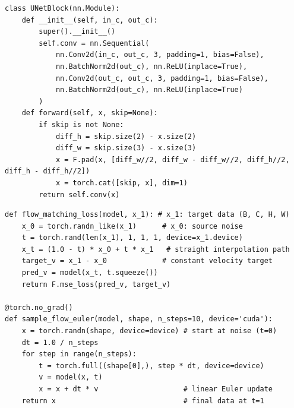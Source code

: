 \begin{lstlisting}
class UNetBlock(nn.Module):
    def __init__(self, in_c, out_c):
        super().__init__()
        self.conv = nn.Sequential(
            nn.Conv2d(in_c, out_c, 3, padding=1, bias=False),
            nn.BatchNorm2d(out_c), nn.ReLU(inplace=True),
            nn.Conv2d(out_c, out_c, 3, padding=1, bias=False),
            nn.BatchNorm2d(out_c), nn.ReLU(inplace=True)
        )
    def forward(self, x, skip=None):
        if skip is not None:
            diff_h = skip.size(2) - x.size(2)
            diff_w = skip.size(3) - x.size(3)
            x = F.pad(x, [diff_w//2, diff_w - diff_w//2, diff_h//2, diff_h - diff_h//2])
            x = torch.cat([skip, x], dim=1)
        return self.conv(x)
\end{lstlisting}

\begin{lstlisting}
def flow_matching_loss(model, x_1): # x_1: target data (B, C, H, W)
    x_0 = torch.randn_like(x_1)      # x_0: source noise
    t = torch.rand(len(x_1), 1, 1, 1, device=x_1.device)
    x_t = (1.0 - t) * x_0 + t * x_1   # straight interpolation path
    target_v = x_1 - x_0             # constant velocity target
    pred_v = model(x_t, t.squeeze())
    return F.mse_loss(pred_v, target_v)

@torch.no_grad()
def sample_flow_euler(model, shape, n_steps=10, device='cuda'):
    x = torch.randn(shape, device=device) # start at noise (t=0)
    dt = 1.0 / n_steps
    for step in range(n_steps):
        t = torch.full((shape[0],), step * dt, device=device)
        v = model(x, t)
        x = x + dt * v                    # linear Euler update
    return x                              # final data at t=1
\end{lstlisting}
